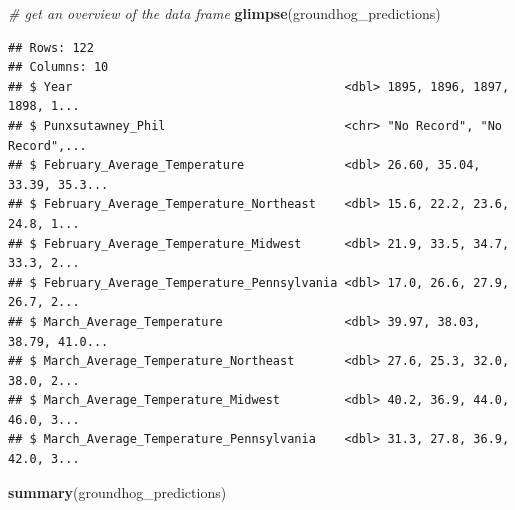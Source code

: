 \documentclass[
]{book}
\newenvironment{Shaded}{\begin{snugshade}}{\end{snugshade}}
\newcommand{\CommentTok}[1]{\textcolor[rgb]{0.56,0.35,0.01}{\textit{#1}}}
\newcommand{\KeywordTok}[1]{\textcolor[rgb]{0.13,0.29,0.53}{\textbf{#1}}}
\newcommand{\NormalTok}[1]{#1}
\begin{document}
\begin{Shaded}
\begin{Highlighting}[]
\CommentTok{# get an overview of the data frame}
\KeywordTok{glimpse}\NormalTok{(groundhog_predictions)}
\end{Highlighting}
\end{Shaded}

\begin{verbatim}
## Rows: 122
## Columns: 10
## $ Year                                      <dbl> 1895, 1896, 1897, 1898, 1...
## $ Punxsutawney_Phil                         <chr> "No Record", "No Record",...
## $ February_Average_Temperature              <dbl> 26.60, 35.04, 33.39, 35.3...
## $ February_Average_Temperature_Northeast    <dbl> 15.6, 22.2, 23.6, 24.8, 1...
## $ February_Average_Temperature_Midwest      <dbl> 21.9, 33.5, 34.7, 33.3, 2...
## $ February_Average_Temperature_Pennsylvania <dbl> 17.0, 26.6, 27.9, 26.7, 2...
## $ March_Average_Temperature                 <dbl> 39.97, 38.03, 38.79, 41.0...
## $ March_Average_Temperature_Northeast       <dbl> 27.6, 25.3, 32.0, 38.0, 2...
## $ March_Average_Temperature_Midwest         <dbl> 40.2, 36.9, 44.0, 46.0, 3...
## $ March_Average_Temperature_Pennsylvania    <dbl> 31.3, 27.8, 36.9, 42.0, 3...
\end{verbatim}

\begin{Shaded}
\begin{Highlighting}[]
\KeywordTok{summary}\NormalTok{(groundhog_predictions)}
\end{Highlighting}
\end{Shaded}
\end{document}
